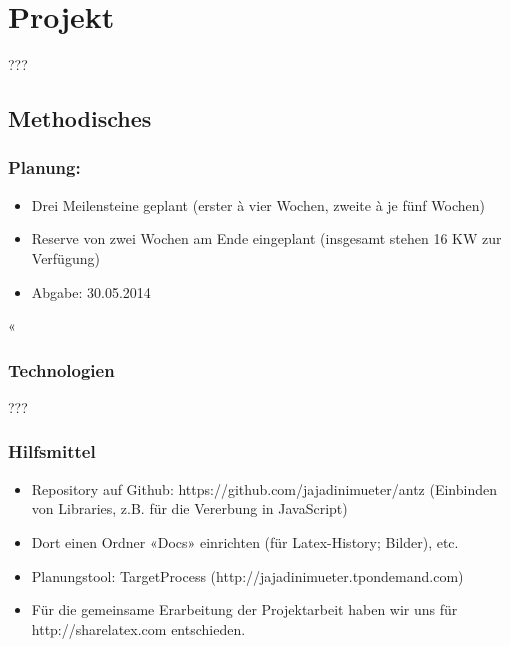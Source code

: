 
\chapter{Projekt}

???

\section{Methodisches}


\subsection*{Planung:}

\begin{itemize}[noitemsep]
\item Drei Meilensteine geplant (erster à vier Wochen, zweite à je fünf Wochen)
\item Reserve von zwei Wochen am Ende eingeplant (insgesamt stehen 16 KW zur Verfügung)
\item Abgabe: 30.05.2014
\end{itemize}

«\vspace*{1cm}


\subsection{Technologien}

???


\subsection{Hilfsmittel}

\begin{itemize}[noitemsep]
\item Repository auf Github: https://github.com/jajadinimueter/antz (Einbinden von Libraries, z.B. für die Vererbung in JavaScript)
\item Dort einen Ordner «Docs» einrichten (für Latex-History; Bilder), etc.
\item Planungstool: TargetProcess (http://jajadinimueter.tpondemand.com)
\item Für die gemeinsame Erarbeitung der Projektarbeit haben wir uns für http://sharelatex.com entschieden.
\end{itemize}


\vspace*{1cm}


\cite[S. 115]{ds-ant}


